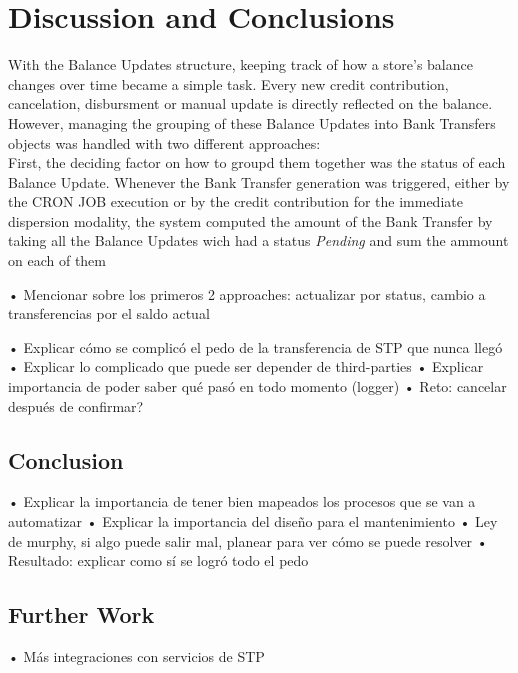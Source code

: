 
\chapter{Discussion and Conclusions}

With the Balance Updates structure, keeping track of how a store's balance changes over time became a simple task. Every new credit contribution, cancelation, disbursment or manual update is directly reflected on the balance. However, managing the grouping of these Balance Updates into Bank Transfers objects was handled with two different approaches:\\

First, the deciding factor on how to groupd them together was the status of each Balance Update. Whenever the Bank Transfer generation was triggered, either by the CRON JOB execution or by the credit contribution for the immediate dispersion modality, the system computed the amount of the Bank Transfer by taking all the Balance Updates wich had a status \textit{Pending} and sum the ammount on each of them

• Mencionar sobre los primeros 2 approaches: actualizar por status, cambio a transferencias por el saldo actual



• Explicar cómo se complicó el pedo de la transferencia de STP que nunca llegó
• Explicar lo complicado que puede ser depender de third-parties
• Explicar importancia de poder saber qué pasó en todo momento (logger)
• Reto: cancelar después de confirmar?



\section{Conclusion}

• Explicar la importancia de tener bien mapeados los procesos que se van a automatizar
• Explicar la importancia del diseño para el mantenimiento
• Ley de murphy, si algo puede salir mal, planear para ver cómo se puede resolver
• Resultado: explicar como sí se logró todo el pedo

\section{Further Work}

• Más integraciones con servicios de STP
